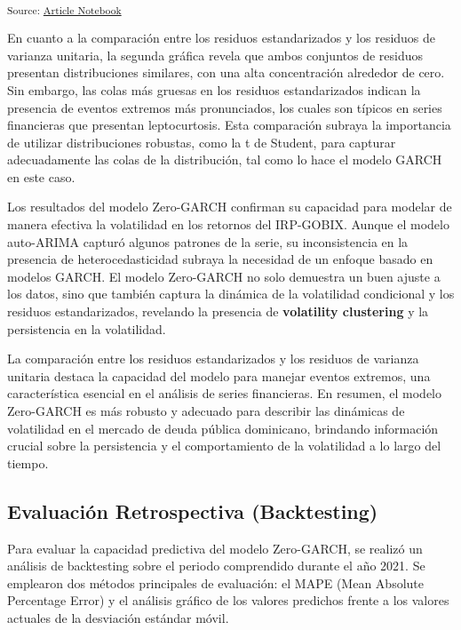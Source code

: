 \documentclass[
  number,
  preprint,
  3p,
  onecolumn]{elsarticle}
\begin{document}
\textsubscript{Source:
\href{https://iancont.github.io/fixed_income_garch/index.qmd.html}{Article
Notebook}}

En cuanto a la comparación entre los residuos estandarizados y los
residuos de varianza unitaria, la segunda gráfica revela que ambos
conjuntos de residuos presentan distribuciones similares, con una alta
concentración alrededor de cero. Sin embargo, las colas más gruesas en
los residuos estandarizados indican la presencia de eventos extremos más
pronunciados, los cuales son típicos en series financieras que presentan
leptocurtosis. Esta comparación subraya la importancia de utilizar
distribuciones robustas, como la t de Student, para capturar
adecuadamente las colas de la distribución, tal como lo hace el modelo
GARCH en este caso.

Los resultados del modelo Zero-GARCH confirman su capacidad para modelar
de manera efectiva la volatilidad en los retornos del IRP-GOBIX. Aunque
el modelo auto-ARIMA capturó algunos patrones de la serie, su
inconsistencia en la presencia de heterocedasticidad subraya la
necesidad de un enfoque basado en modelos GARCH. El modelo Zero-GARCH no
solo demuestra un buen ajuste a los datos, sino que también captura la
dinámica de la volatilidad condicional y los residuos estandarizados,
revelando la presencia de \textbf{volatility clustering} y la
persistencia en la volatilidad.

La comparación entre los residuos estandarizados y los residuos de
varianza unitaria destaca la capacidad del modelo para manejar eventos
extremos, una característica esencial en el análisis de series
financieras. En resumen, el modelo Zero-GARCH es más robusto y adecuado
para describir las dinámicas de volatilidad en el mercado de deuda
pública dominicano, brindando información crucial sobre la persistencia
y el comportamiento de la volatilidad a lo largo del tiempo.

\subsection{Evaluación Retrospectiva
(Backtesting)}\label{evaluaciuxf3n-retrospectiva-backtesting}

Para evaluar la capacidad predictiva del modelo Zero-GARCH, se realizó
un análisis de backtesting sobre el periodo comprendido durante el año
2021. Se emplearon dos métodos principales de evaluación: el MAPE (Mean
Absolute Percentage Error) y el análisis gráfico de los valores
predichos frente a los valores actuales de la desviación estándar móvil.
\end{document}
